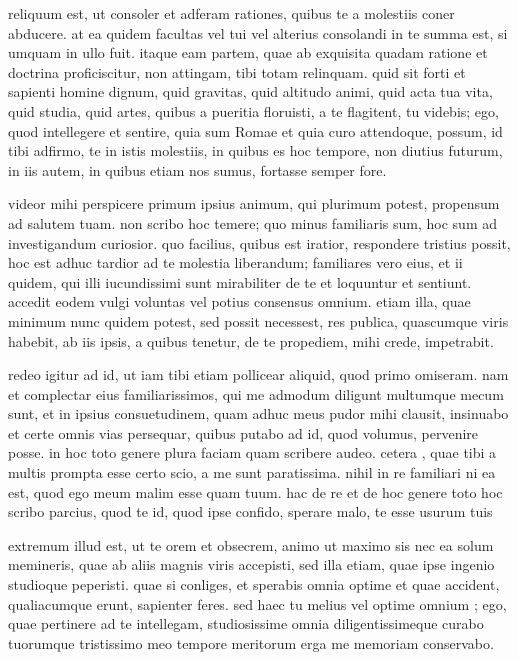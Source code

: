  reliquum est, ut consoler et adferam rationes, quibus te a molestiis coner abducere. at ea quidem facultas vel tui vel alterius consolandi in te summa est, si umquam in ullo fuit. itaque eam partem, quae ab exquisita quadam ratione et doctrina proficiscitur, non attingam, tibi totam relinquam. quid sit forti et sapienti homine dignum, quid gravitas, quid altitudo animi, quid acta tua vita, quid studia, quid artes, quibus a pueritia floruisti, a te flagitent, tu videbis; ego, quod intellegere et sentire, quia sum Romae et quia curo attendoque, possum, id tibi adfirmo, te in istis molestiis, in quibus es hoc tempore, non diutius futurum, in iis autem, in quibus etiam nos sumus, fortasse semper fore.

 videor mihi perspicere primum ipsius animum, qui plurimum potest, propensum ad salutem tuam. non scribo hoc temere; quo minus familiaris sum, hoc sum ad investigandum curiosior. quo facilius, quibus est iratior, respondere tristius possit, hoc est adhuc tardior ad te molestia liberandum; familiares vero eius, et ii quidem, qui illi iucundissimi sunt mirabiliter de te et loquuntur et sentiunt. accedit eodem vulgi voluntas vel potius consensus omnium. etiam illa, quae minimum nunc quidem potest, sed possit necessest, res publica, quascumque viris habebit, ab iis ipsis, a quibus tenetur, de te propediem, mihi crede, impetrabit.

 redeo igitur ad id, ut iam tibi etiam pollicear aliquid, quod primo omiseram. nam et complectar eius familiarissimos, qui me admodum diligunt multumque mecum sunt, et in ipsius consuetudinem, quam adhuc meus pudor mihi clausit, insinuabo et certe omnis vias persequar, quibus putabo ad id, quod volumus, pervenire posse. in hoc toto genere plura faciam quam scribere audeo. cetera , quae tibi a multis prompta esse certo scio, a me sunt paratissima. nihil in re familiari ni ea est, quod ego meum malim esse quam tuum. hac de re et de hoc genere toto hoc scribo parcius, quod te id, quod ipse confido, sperare malo, te esse usurum tuis

 extremum illud est, ut te orem et obsecrem, animo ut maximo sis nec ea solum memineris, quae ab aliis magnis viris accepisti, sed illa etiam, quae ipse ingenio studioque peperisti. quae si conliges, et sperabis omnia optime et quae accident, qualiacumque erunt, sapienter feres. sed haec tu melius vel optime omnium ; ego, quae pertinere ad te intellegam, studiosissime omnia diligentissimeque curabo tuorumque tristissimo meo tempore meritorum erga me memoriam conservabo.
